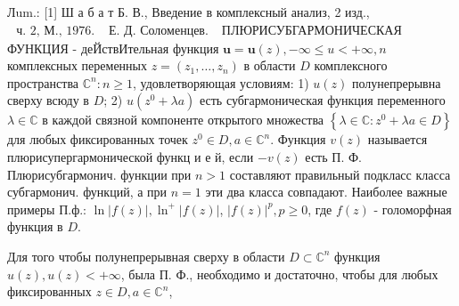 \documentclass[10pt]{article}
\begin{document}
Лum.: [1] Ш а б а т Б. В., Введение в комплексный анализ, 2 изд., $\begin{array}{ll}\text { ч. 2, М., } 1976 . & \text { Е. Д. Соломенцев. }\end{array}$ ПЛЮРИСУБГАРМОНИЧЕСКАЯ ФУНКЦИЯ - деЙствИтельная функция $\boldsymbol{u}=\boldsymbol{u}(z),-\infty \leqslant u<+\infty, n$ комплексных переменных $z=\left(z_{1}, \ldots, z_{n}\right)$ в области $D$ комплексного пространства $\mathbb{C}^{n}: n \geqslant 1$, удовлетворяющая условиям: 1) $u(z)$ полунепрерывна сверху всюду в $D$; 2) $u\left(z^{0}+\lambda a\right)$ есть субгармоническая функция переменного $\lambda \in \mathbb{C}$ в каждой связной компоненте открытого множества $\left\{\lambda \in \mathbb{C}: z^{0}+\lambda a \in D\right\}$ для любых фиксированных точек $z^{0} \in D, a \in \mathbb{C}^{n}$. Функция $v(z)$ называется плюрисупергармонической функц и е й, если $-v(z)$ есть П. Ф. Плюрисубгармонич. функции при $n>1$ составляют правильный подкласс класса субгармонич. функций, а при $n=1$ эти два класса совпадают. Наиболее важные примеры П.ф.: $\ln |f(z)|, \ln ^{+}|f(z)|$, $|f(z)|^{p}, p \geqslant 0$, где $f(z)$ - голоморфная функция в $D$.



Для того чтобы полунепрерывная сверху в области $D \subset \mathbb{C}^{n}$ функция $u(z), u(z)<+\infty$, была П. Ф., необходимо и достаточно, чтобы для любых фиксированных $z \in D, a \in \mathbb{C}^{n}$,
\end{document}
